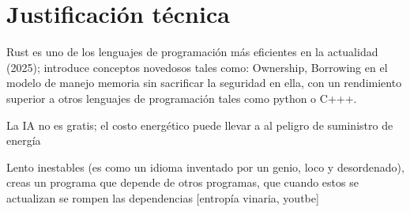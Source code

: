 \section{Justificación técnica}
    Rust es uno de los lenguajes de programación más eficientes en la actualidad (2025); introduce conceptos novedosos tales como: Ownership, Borrowing en el modelo de manejo memoria sin sacrificar la seguridad en ella, con un rendimiento superior a otros lenguajes de programación tales como python o C+++.

    La IA no es gratis; el costo energético puede llevar a al peligro de suministro de energía

    Lento inestables (es como un idioma inventado por un genio, loco y desordenado), creas un programa que depende de otros programas, que cuando estos se actualizan se rompen las dependencias [entropía vinaria, youtbe]
